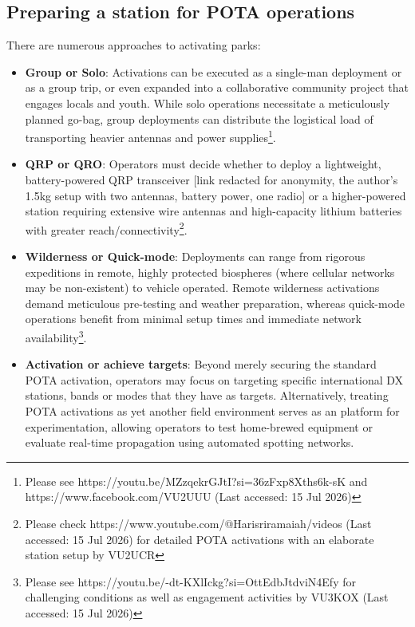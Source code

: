 \documentclass[conference]{IEEEtran}
\begin{document}
\subsection{Preparing a station for POTA operations}
\label{subsection:station}
There are numerous approaches to activating parks:
\begin{itemize}
\item \textbf{Group or Solo}: Activations can be executed as a
  single-man deployment or as a group trip, or even expanded into a
  collaborative community project that engages locals and youth. While
  solo operations necessitate a meticulously planned go-bag, group
  deployments can distribute the logistical load of transporting
  heavier antennas and power supplies\footnote{Please see
    https://youtu.be/MZzqekrGJtI?si=36zFxp8Xths6k-sK and
    https://www.facebook.com/VU2UUU (Last accessed: 15 Jul 2026)}.
\item \textbf{QRP or QRO}:  Operators must decide whether to deploy a
  lightweight, battery-powered QRP transceiver [link redacted for
  anonymity, the author's 1.5kg setup with two antennas, battery
  power, one radio] or a higher-powered station requiring extensive
  wire antennas and high-capacity lithium batteries with greater
  reach/connectivity\footnote{Please check
    https://www.youtube.com/@Harisriramaiah/videos (Last accessed: 15
    Jul 2026) for detailed POTA activations with an elaborate station
    setup by VU2UCR}.
\item \textbf{Wilderness or Quick-mode}: Deployments can range from
  rigorous expeditions in remote, highly protected biospheres (where
  cellular networks may be non-existent) to vehicle operated. Remote
  wilderness activations demand meticulous pre-testing and weather
  preparation, whereas quick-mode operations benefit from minimal
  setup times and immediate network availability\footnote{Please see
    https://youtu.be/-dt-KXlIckg?si=OttEdbJtdviN4Efy for challenging
    conditions as well as engagement activities by VU3KOX (Last
    accessed: 15 Jul 2026)}.
\item \textbf{Activation or achieve targets}: Beyond merely securing
  the standard POTA activation, operators may focus on targeting
  specific international DX stations, bands or modes that they have as
  targets. Alternatively, treating POTA activations as yet another
  field environment serves as an platform for experimentation,
  allowing operators to test home-brewed equipment or evaluate
  real-time propagation using automated spotting
  networks.
\end{itemize}
\end{document}
